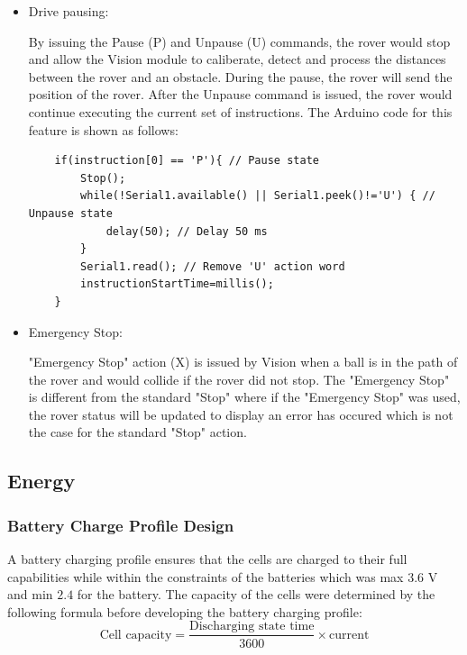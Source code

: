 \documentclass[11pt, a4paper]{article}
\begin{document}
\begin{itemize}

    \item Drive pausing:
    
    By issuing the Pause (P) and Unpause (U) commands, the rover would stop and allow the Vision module to caliberate, detect and process the distances between the rover and an obstacle. During the pause, the rover will send the position of the rover. After the Unpause command is issued, the rover would continue executing the current set of instructions. The Arduino code for this feature is shown as follows:
    \begin{lstlisting}
    if(instruction[0] == 'P'){ // Pause state
        Stop();
        while(!Serial1.available() || Serial1.peek()!='U') { // Unpause state
            delay(50); // Delay 50 ms
        }
        Serial1.read(); // Remove 'U' action word
        instructionStartTime=millis();
    }
    \end{lstlisting}

    \item Emergency Stop:
    
    "Emergency Stop" action (X) is issued by Vision when a ball is in the path of the rover and would collide if the rover did not stop. The "Emergency Stop" is different from the standard "Stop" where if the "Emergency Stop" was used, the rover status will be updated to display an error has occured which is not the case for the standard "Stop" action. 

\end{itemize}

\pagebreak
\subsection{Energy}
\subsubsection{Battery Charge Profile Design}

A battery charging profile ensures that the cells are charged to their full capabilities while within the constraints of the batteries which was max $3.6$ V and min $2.4$ for the battery. The capacity of the cells were determined by the following formula before developing the battery charging profile:
$$
\text{Cell capacity} = \frac{\text{Discharging state time}}{3600} \times \text{current}
$$
\end{document}
